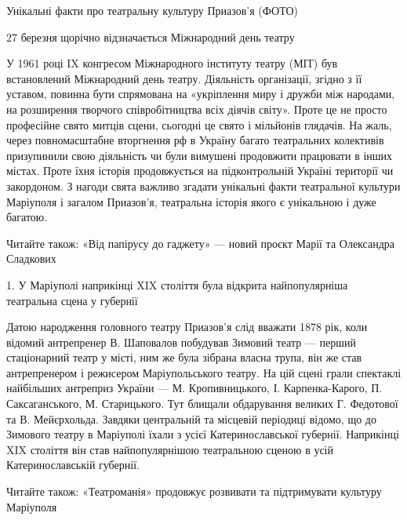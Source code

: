  
 
 
 
 

Унікальні факти про театральну культуру Приазов'я (ФОТО)

27 березня щорічно відзначається Міжнародний день театру

У 1961 році IX конгресом Міжнародного інституту театру (МІТ) був встановлений
Міжнародний день театру. Діяльність організації, згідно з її уставом, повинна
бути спрямована на «укріплення миру і дружби між народами, на розширення
творчого співробітництва всіх діячів світу». Проте це не просто професійне
свято митців сцени, сьогодні це свято і мільйонів глядачів. На жаль, через
повномасштабне вторгнення рф в Україну багато театральних колективів
призупинили свою діяльність чи були вимушені продовжити працювати в інших
містах. Проте їхня історія продовжується на підконтрольній Україні території чи
закордоном. З нагоди свята важливо згадати унікальні факти театральної культури
Маріуполя і загалом Приазов'я, театральна історія якого є унікальною і дуже
багатою.

Читайте також: «Від папірусу до гаджету» — новий проєкт Марії та Олександра
Сладкових

1. У Маріуполі наприкінці XIX століття була відкрита найпопулярніша театральна
сцена у губернії

Датою народження головного театру Приазов'я слід вважати 1878 рік, коли відомий
антрепренер В. Шаповалов побудував Зимовий театр — перший стаціонарний театр у
місті, ним же була зібрана власна трупа, він же став антрепренером і режисером
Маріупольського театру. На цій сцені грали спектаклі найбільших антреприз
України — М. Кропивницького, І. Карпенка-Карого, П. Саксаганського, М.
Старицького. Тут блищали обдарування великих Г. Федотової та В. Мейєрхольда.
Завдяки центральній та місцевій періодиці відомо, що до Зимового театру в
Маріуполі їхали з усієї Катеринославської губернії. Наприкінці XIX століття він
став найпопулярнішою театральною сценою в усій Катеринославській губернії.

Читайте також: «Театроманія» продовжує розвивати та підтримувати культуру Маріуполя

